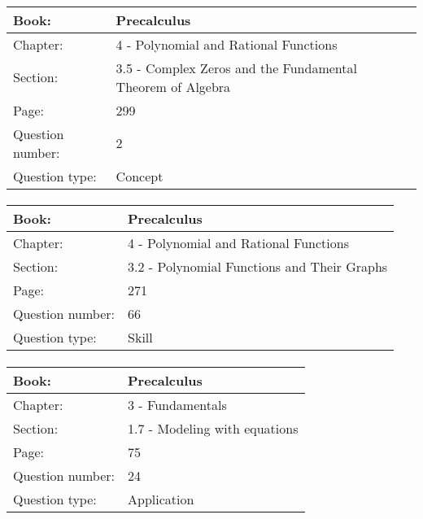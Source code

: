 \documentclass{article}
\begin{document}
   \paragraph{}
   \begin{tabularx}{1\textwidth}{
           p{}
           p{}
       }
       \toprule
       Book: & Precalculus
       \\
       \midrule
       Chapter: & 4 - Polynomial and Rational Functions
       \\
       \midrule
       Section: & 3.5 - Complex Zeros and the Fundamental Theorem of Algebra
       \\
       \midrule
       Page: & 299
       \\
       \midrule
       Question number: & 2
       \\
       \midrule
       Question type: & Concept
       \\
       \bottomrule
   \end{tabularx}



   \paragraph{}
   \begin{tabularx}{1\textwidth}{
           p{}
           p{}
       }
       \toprule
       Book: & Precalculus
       \\
       \midrule
       Chapter: & 4 - Polynomial and Rational Functions
       \\
       \midrule
       Section: & 3.2 - Polynomial Functions and Their Graphs
       \\
       \midrule
       Page: & 271
       \\
       \midrule
       Question number: & 66
       \\
       \midrule
       Question type: & Skill
       \\
       \bottomrule
   \end{tabularx}



   \paragraph{}
   \begin{tabularx}{1\textwidth}{
           p{}
           p{}
       }
       \toprule
       Book: & Precalculus
       \\
       \midrule
       Chapter: & 3 - Fundamentals
       \\
       \midrule
       Section: & 1.7 - Modeling with equations
       \\
       \midrule
       Page: & 75
       \\
       \midrule
       Question number: & 24
       \\
       \midrule
       Question type: & Application
       \\
       \bottomrule
   \end{tabularx}
\end{document}

